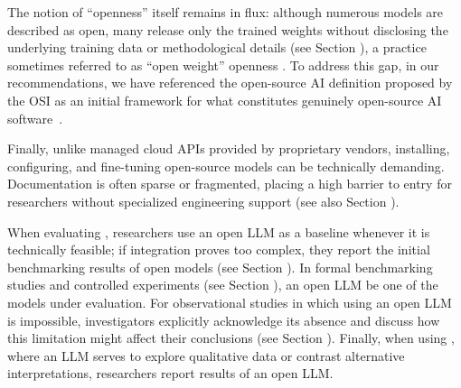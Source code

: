 The notion of ``openness'' itself remains in flux: although numerous models are described as open, many release only the trained weights without disclosing the underlying training data or methodological details (see Section \modelversion), a practice sometimes referred to as ``open weight'' openness \cite{Gibney2024}.
To address this gap, in our recommendations, we have referenced the open-source AI definition proposed by the OSI as an initial framework for what constitutes genuinely open-source AI software~\cite{OSIAI2024}. 

Finally, unlike managed cloud APIs provided by proprietary vendors, installing, configuring, and fine-tuning open-source models can be technically demanding.
Documentation is often sparse or fragmented, placing a high barrier to entry for researchers without specialized engineering support (see also Section \limitationsmitigations).


When evaluating \newtools, researchers \should use an open LLM as a baseline whenever it is technically feasible; if integration proves too complex, they \should report the initial benchmarking results of open models (see Section \benchmarksmetrics).
In formal benchmarking studies and controlled experiments (see Section \benchmarkingtasks), an open LLM \must be one of the models under evaluation.
For observational studies in which using an open LLM is impossible, investigators \should explicitly acknowledge its absence and discuss how this limitation might affect their conclusions (see Section \limitationsmitigations).
Finally, when using \synthesis,  where an LLM serves to explore qualitative data or contrast alternative interpretations, researchers \may report results of an open LLM.
